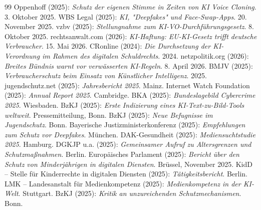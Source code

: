 \documentclass[12pt,a4paper]{article}
\begin{document}
\begin{thebibliography}{99}
		 Oppenhoff (2025): \emph{Schutz der eigenen Stimme in Zeiten von KI Voice Cloning}. 3. Oktober 2025.
		 WBS Legal (2025): \emph{KI, "Deepfakes" und Face-Swap-Apps}. 20. November 2025.
		 vzbv (2025): \emph{Stellungnahme zum KI-VO-Durchführungsgesetz}. 8. Oktober 2025.
		 rechtsanwalt.com (2026): \emph{KI-Haftung: EU-KI-Gesetz trifft deutsche Verbraucher}. 15. Mai 2026.
		 CRonline (2024): \emph{Die Durchsetzung der KI-Verordnung im Rahmen des digitalen Schuldrechts}. 2024.
		 netzpolitik.org (2026): \emph{Breites Bündnis warnt vor verwässerten KI-Regeln}. 8. April 2026.
		 BMJV (2025): \emph{Verbraucherschutz beim Einsatz von Künstlicher Intelligenz}. 2025.
		 jugendschutz.net (2025): \emph{Jahresbericht 2025}. Mainz.
		 Internet Watch Foundation (2025): \emph{Annual Report 2025}. Cambridge.
		 BKA (2025): \emph{Bundeslagebild Cybercrime 2025}. Wiesbaden.
		 BzKJ (2025): \emph{Erste Indizierung eines KI-Text-zu-Bild-Tools weltweit}. Pressemitteilung, Bonn.
		 BzKJ (2025): \emph{Neue Befugnisse im Jugendschutz}. Bonn.
		 Bayerische Justizministerkonferenz (2025): \emph{Empfehlungen zum Schutz vor Deepfakes}. München.
		 DAK-Gesundheit (2025): \emph{Mediensuchtstudie 2025}. Hamburg.
		 DGKJP u.a. (2025): \emph{Gemeinsamer Aufruf zu Altersgrenzen und Schutzmaßnahmen}. Berlin.
		 Europäisches Parlament (2025): \emph{Bericht über den Schutz von Minderjährigen in digitalen Diensten}. Brüssel, November 2025.
		 KidD – Stelle für Kinderrechte in digitalen Diensten (2025): \emph{Tätigkeitsbericht}. Berlin.
		 LMK – Landesanstalt für Medienkompetenz (2025): \emph{Medienkompetenz in der KI-Welt}. Stuttgart.
		 BzKJ (2025): \emph{Kritik an unzureichenden Schutzmechanismen}. Bonn.
		

\end{thebibliography}
\end{document}
